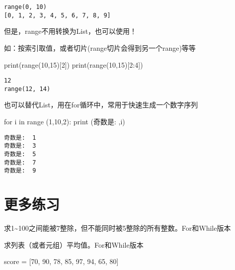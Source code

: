 \documentclass[
  letterpaper,
  DIV=11,
  numbers=noendperiod]{scrreprt}
\newenvironment{Shaded}{\begin{snugshade}}{\end{snugshade}}
\newcommand{\BuiltInTok}[1]{\textcolor[rgb]{0.00,0.23,0.31}{#1}}
\newcommand{\ControlFlowTok}[1]{\textcolor[rgb]{0.00,0.23,0.31}{#1}}
\newcommand{\DecValTok}[1]{\textcolor[rgb]{0.68,0.00,0.00}{#1}}
\newcommand{\KeywordTok}[1]{\textcolor[rgb]{0.00,0.23,0.31}{#1}}
\newcommand{\NormalTok}[1]{\textcolor[rgb]{0.00,0.23,0.31}{#1}}
\newcommand{\OperatorTok}[1]{\textcolor[rgb]{0.37,0.37,0.37}{#1}}
\newcommand{\StringTok}[1]{\textcolor[rgb]{0.13,0.47,0.30}{#1}}
\begin{document}
\begin{verbatim}
range(0, 10)
[0, 1, 2, 3, 4, 5, 6, 7, 8, 9]
\end{verbatim}

但是，range不用转换为List，也可以使用！

如：按索引取值，或者切片(range切片会得到另一个range)等等

\begin{Shaded}
\begin{Highlighting}[]
\BuiltInTok{print}\NormalTok{(}\BuiltInTok{range}\NormalTok{(}\DecValTok{10}\NormalTok{,}\DecValTok{15}\NormalTok{)[}\DecValTok{2}\NormalTok{])}
\BuiltInTok{print}\NormalTok{(}\BuiltInTok{range}\NormalTok{(}\DecValTok{10}\NormalTok{,}\DecValTok{15}\NormalTok{)[}\DecValTok{2}\NormalTok{:}\DecValTok{4}\NormalTok{])}
\end{Highlighting}
\end{Shaded}

\begin{verbatim}
12
range(12, 14)
\end{verbatim}

也可以替代List，用在for循环中，常用于快速生成一个数字序列

\begin{Shaded}
\begin{Highlighting}[]
\ControlFlowTok{for}\NormalTok{ i }\KeywordTok{in} \BuiltInTok{range}\NormalTok{ (}\DecValTok{1}\NormalTok{,}\DecValTok{10}\NormalTok{,}\DecValTok{2}\NormalTok{):}
    \BuiltInTok{print}\NormalTok{ (}\StringTok{\textquotesingle{}奇数是: \textquotesingle{}}\NormalTok{,i) }
\end{Highlighting}
\end{Shaded}

\begin{verbatim}
奇数是:  1
奇数是:  3
奇数是:  5
奇数是:  7
奇数是:  9
\end{verbatim}

\hypertarget{ux66f4ux591aux7ec3ux4e60}{%
\section{更多练习}\label{ux66f4ux591aux7ec3ux4e60}}

求1\textasciitilde100之间能被7整除，但不能同时被5整除的所有整数。For和While版本

求列表（或者元组）平均值。For和While版本

\begin{Shaded}
\begin{Highlighting}[]
\NormalTok{score }\OperatorTok{=}\NormalTok{ [}\DecValTok{70}\NormalTok{, }\DecValTok{90}\NormalTok{, }\DecValTok{78}\NormalTok{, }\DecValTok{85}\NormalTok{, }\DecValTok{97}\NormalTok{, }\DecValTok{94}\NormalTok{, }\DecValTok{65}\NormalTok{, }\DecValTok{80}\NormalTok{]}
\end{Highlighting}
\end{Shaded}
\end{document}
